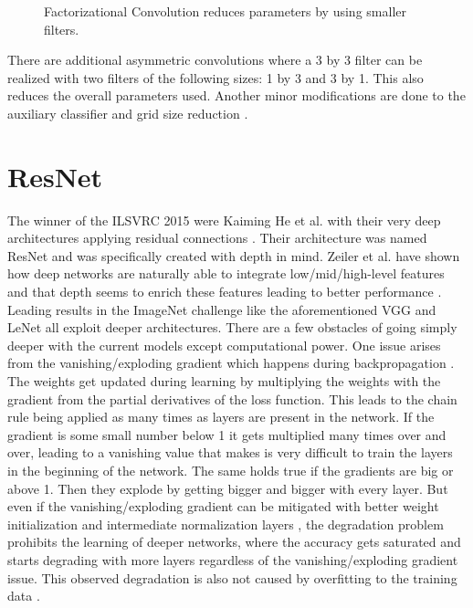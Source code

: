 \begin{figure}[H]
\centering
\caption{Factorizational Convolution reduces parameters by using smaller filters.}
\label{fig:factorization}
\end{figure}

There are additional asymmetric convolutions where a 3 by 3 filter can be realized with two filters of the following sizes: 1 by 3 and 3 by 1. This also reduces the overall parameters used. Another minor modifications are done to the auxiliary classifier and grid size reduction \cite{szegedy2016rethinking}.








\section{ResNet}

The winner of the ILSVRC 2015 were Kaiming He et al. with their very deep architectures applying residual connections \cite{he2016deep, he2016identity}. Their architecture was named ResNet and was specifically created with depth in mind. Zeiler et al. have shown how deep networks are naturally able to integrate low/mid/high-level features and that depth seems to enrich these features leading to better performance \cite{zeiler2014visualizing}. Leading results in the ImageNet challenge like the aforementioned VGG \cite{simonyan2014very} and LeNet \cite{szegedy2015going} all exploit deeper architectures. There are a few obstacles of going simply deeper with the current models except computational power. One issue arises from the vanishing/exploding gradient which happens during backpropagation \cite{glorot2010understanding}. The weights get updated during learning by multiplying the weights with the gradient from the partial derivatives of the loss function. This leads to the chain rule being applied as many times as layers are present in the network. If the gradient is some small number below 1 it gets multiplied many times over and over, leading to a vanishing value that makes is very difficult to train the layers in the beginning of the network. The same holds true if the gradients are big or above 1. Then they explode by getting bigger and bigger with every layer. But even if the vanishing/exploding gradient can be mitigated with better weight initialization and intermediate normalization layers \cite{ioffe2015batch}, the degradation problem prohibits the learning of deeper networks, where the accuracy gets saturated and starts degrading with more layers \cite{he2016deep} regardless of the vanishing/exploding gradient issue. This observed degradation is also not caused by overfitting to the training data \cite{he2015convolutional, srivastava2015highway}.\\

